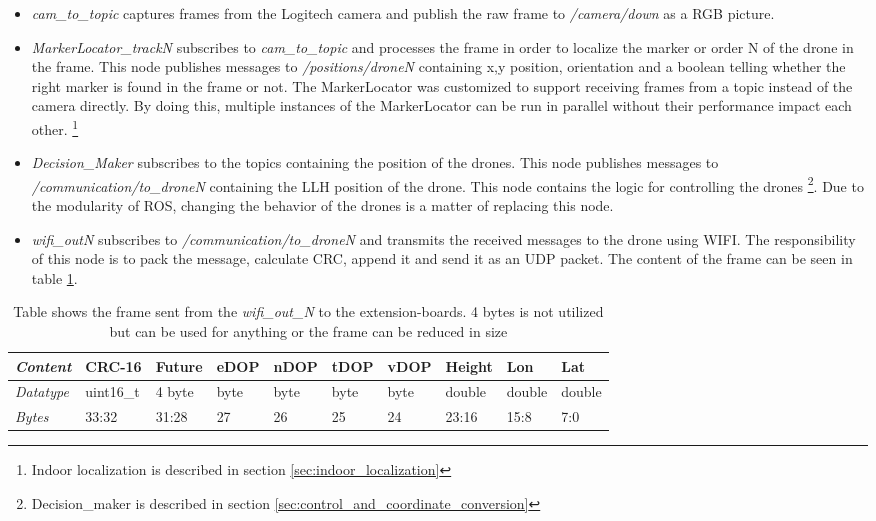 \begin{itemize}
	\item \textit{cam\_to\_topic} captures frames from the Logitech camera and publish the raw frame to \textit{/camera/down} as a RGB picture.
	\item \textit{MarkerLocator\_trackN} subscribes to \textit{cam\_to\_topic} and processes the frame in order to localize the marker or order N of the drone in the frame. This node publishes messages to \textit{/positions/droneN} containing x,y position, orientation and a boolean telling whether the right marker is found in the frame or not. The MarkerLocator was customized to support receiving frames from a topic instead of the camera directly. By doing this, multiple instances of the MarkerLocator can be run in parallel without their performance impact each other. \footnote{Indoor localization is described in section \ref{sec:indoor_localization}}
	\item \textit{Decision\_Maker} subscribes to the topics containing the position of the drones. This node publishes messages to \textit{/communication/to\_droneN} containing the \ac{LLH} position of the drone. This node contains the logic for controlling the drones \footnote{Decision\_maker is described in section \ref{sec:control_and_coordinate_conversion}}. Due to the modularity of ROS, changing the behavior of the drones is a matter of replacing this node.
	\item \textit{wifi\_outN} subscribes to \textit{/communication/to\_droneN} and transmits the received messages to the drone using WIFI. The responsibility of this node is to pack the message, calculate \ac{CRC}, append it and send it as an \ac{UDP} packet. The content of the frame can be seen in table \ref{tab:wifi_frame}.
\end{itemize}

\begin{table}[H]
\centering
\begin{tabular}{@{}|l|l|l|l|l|l|l|l|l|l|@{}}
\toprule
\textit{Content}  & CRC-16    & Future  & eDOP  & nDOP & tDOP & vDOP &      Height   & Lon     & Lat       \\ \midrule
\textit{Datatype} & uint16\_t & 4 byte  & byte  & byte & byte & byte &      double   & double  & double  \\ \midrule
\textit{Bytes}    & 33:32     &  31:28  & 27    & 26   & 25   & 24   &      23:16    & 15:8    & 7:0       \\ \bottomrule
\end{tabular}
\caption{Table shows the frame sent from the \textit{wifi\_out\_N} to the extension-boards. 4 bytes is not utilized but can be used for anything or the frame can be reduced in size}
\label{tab:wifi_frame}
\end{table}

